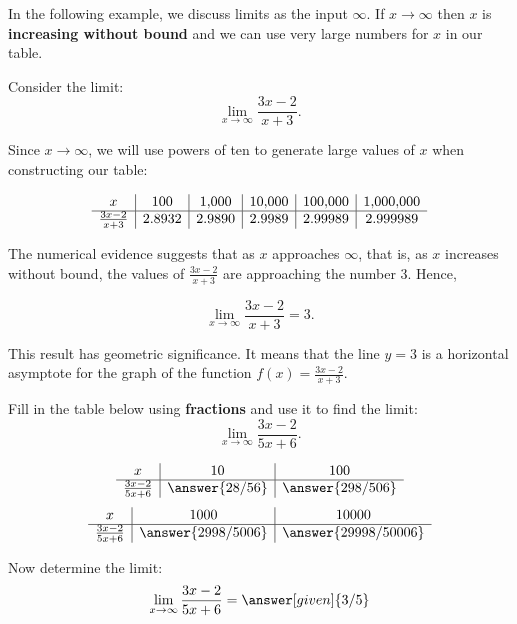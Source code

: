 \documentclass{ximera}
\begin{document}
In the following example, we discuss limits as the input $\infty$.
If $x \to \infty$ then $x$ is \textbf{increasing without bound} and we can use very large numbers for $x$ in our table.

\begin{example}[example 6]
Consider the limit:
\[\lim_{x \to \infty} \frac{3x -2}{x + 3}. \]

Since $x \to \infty$, we will use powers of ten to generate large values of $x$ when constructing 
our table: 

\[
\begin{array}{ c | c | c | c | c|c}
  x & 100 & 1{,}000 & 10{,}000 & 100{,}000 & 1{,}000{,}000\\ 
	\hline
	 \frac{3x-2}{x+3} & 2.8932 & 2.9890 & 2.9989 & 2.99989 & 2.999989
	\end{array}
\] 

The numerical evidence suggests that as $x$ approaches $\infty$, that is, 
as $x$ increases without bound, the values of $\frac{3x -2}{x +3}$ are approaching the number $3$. Hence,



\[\lim_{x \to \infty} \frac{3x -2}{x +3} = 3. \]

This result has geometric significance.  It means that the line $y = 3$ is a horizontal 
asymptote for the graph of the function $f(x) = \frac{3x -2}{x +3}.$
\end{example}


\begin{problem}[problem 6]
Fill in the table below using \textbf{fractions} and use it to find the limit:
\[\lim_{x \to \infty} \frac{3x-2}{5x+6}.\]

\begin{prompt}
\begin{center}
\[
\begin{array}{ c | c | c }
  x & 10 & 100   \\ 
	\hline 
	 \frac{3x-2}{5x+6} & \answer{28/56} & \answer{298/506} 
\end{array}
\]
\[
\begin{array}{ c | c | c  }
  x  & 1000 & 10000 \\ 
	\hline 
	 \frac{3x-2}{5x+6}  & \answer{2998/5006} & \answer{29998/50006}
\end{array}
\]
\end{center}
Now determine the limit:
\[
\lim_{x \to \infty} \frac{3x-2}{5x+6} = \answer[given]{3/5}
\]
\end{prompt}
\end{problem}
\end{document}
